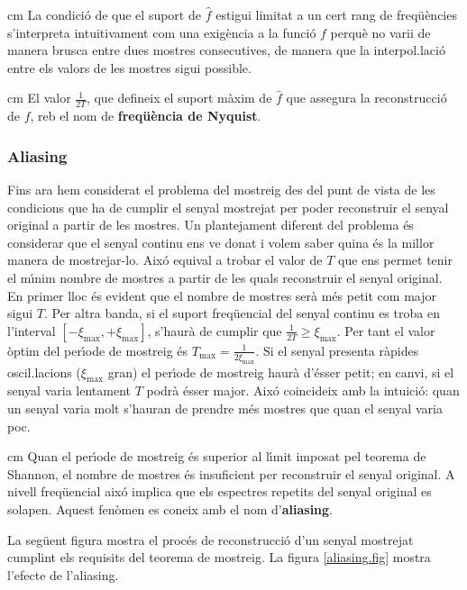 \documentclass{article}
\begin{document}
 cm
La condici\'o de que el suport de $\hat{f}$ estigui limitat a un
cert rang de freq\"u\`encies s'interpreta intuitivament com una
exig\`encia a la funci\'o $f$ perqu\`e no varii de manera brusca
entre dues mostres consecutives, de manera que la interpol.laci\'o
entre els valors de les mostres sigui possible.

 cm
El valor $\frac{1}{2T}$, que defineix el suport m\`axim
de $\hat{f}$ que assegura la reconstrucci\'o de $f$, reb el nom de 
{\bf freq\"u\`encia de Nyquist}.

\subsubsection{Aliasing}
Fins ara hem considerat el problema del mostreig des del
punt de vista de les condicions que ha de cumplir el senyal
mostrejat per poder reconstruir el senyal original a partir
de les mostres. Un plantejament diferent del problema \'es 
considerar que el senyal continu ens ve donat i volem
saber quina \'es la millor manera de mostrejar-lo. Aix\'o
equival a trobar el valor de $T$ que ens permet tenir el 
m\'\i nim nombre de mostres a partir de les quals reconstruir
el senyal original.
\newline
En primer lloc \'es evident que el nombre de mostres ser\`a m\'es 
petit com major sigui $T$. Per altra banda,
si el suport freq\"uencial del senyal continu es troba
en l'interval $[-\xi_{\mathrm{max}}, +\xi_{\mathrm{max}}]$, 
s'haur\`a de cumplir que $\frac{1}{2T} \geq \xi_{\mathrm{max}}$.
Per tant el valor \`optim del per\'\i ode de mostreig \'es 
$T_{\mathrm{max}} = \frac{1}{2 \xi_{\mathrm{max}}}$.
Si el senyal presenta r\`apides oscil.lacions ($\xi_{\mathrm{max}}$ gran)
el per\'\i ode de mostreig haur\`a d'\'esser petit; en canvi, si el 
senyal varia lentament $T$ podr\`a \'esser major. Aix\'o coincideix 
amb la intuici\'o: quan un senyal varia molt s'hauran
de prendre m\'es mostres que quan el senyal varia poc.

 cm
Quan el per\'\i ode de mostreig \'es superior al l\'\i mit imposat
pel teorema de Shannon, el nombre de mostres \'es insuficient per
reconstruir el senyal original. A nivell freq\"uencial aix\'o implica
que els espectres repetits del senyal original es solapen. Aquest
fen\`omen es coneix amb el nom d'{\bf aliasing}.

La seg\"uent figura mostra el proc\'es de reconstrucci\'o d'un senyal
mostrejat cumplint els requisits del teorema de mostreig. La figura
\ref{aliasing.fig} mostra l'efecte de l'aliasing.
\end{document}
